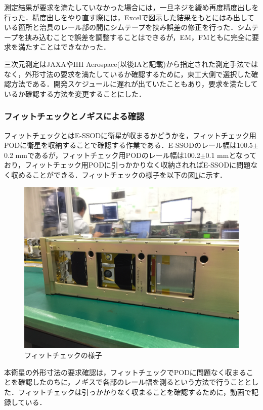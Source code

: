 測定結果が要求を満たしていなかった場合には，一旦ネジを緩め再度精度出しを行った．精度出しをやり直す際には，Excelで図示した結果をもとにはみ出している箇所と治具のレール部の間にシムテープを挟み誤差の修正を行った．シムテープを挟み込むことで誤差を調整することはできるが，EM，FMともに完全に要求を満たすことはできなかった．

三次元測定はJAXAやIHI Aerospace(以後IAと記載)から指定された測定手法ではなく，外形寸法の要求を満たしているか確認するために，東工大側で選択した確認方法である．開発スケジュールに遅れが出ていたこともあり，要求を満たしているか確認する方法を変更することにした．

\subsubsection{フィットチェックとノギスによる確認}

フィットチェックとはE-SSODに衛星が収まるかどうかを，フィットチェック用PODに衛星を収納することで確認する作業である．E-SSODのレール幅は100.5$\pm$0.2 mmであるが，フィットチェック用PODのレール幅は100.2$\pm$0.1 mmとなっており，フィットチェック用PODに引っかかりなく収納されればE-SSODに問題なく収めることができる．フィットチェックの様子を以下の図\ref{fig:fitcheck}に示す．

\begin{figure}[h]
	\begin{center}
		
		\includegraphics[width=0.6\linewidth]{04/fig/fitcheck.JPG}
		\caption{フィットチェックの様子}
		\label{fig:fitcheck}
		
	\end{center}
\end{figure}

本衛星の外形寸法の要求確認は，フィットチェックでPODに問題なく収まることを確認したのちに，ノギスで各部のレール幅を測るという方法で行うこととした．フィットチェックは引っかかりなく収まることを確認するために，動画で記録している．


